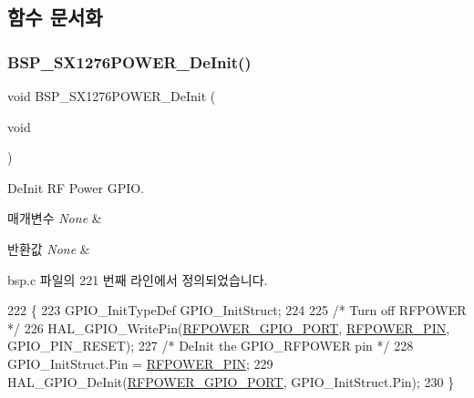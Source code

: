 \subsection{함수 문서화}
\mbox{\label{group___docking_station___r_f___power___functions_ga42c7cbbf0254f5f11135797d083bcb2c}} 
\subsubsection{\texorpdfstring{B\+S\+P\+\_\+\+S\+X1276\+P\+O\+W\+E\+R\+\_\+\+De\+Init()}{BSP\_SX1276POWER\_DeInit()}}
{\footnotesize\ttfamily void B\+S\+P\+\_\+\+S\+X1276\+P\+O\+W\+E\+R\+\_\+\+De\+Init (\begin{DoxyParamCaption}\item[{void}]{ }\end{DoxyParamCaption})}



De\+Init RF Power G\+P\+IO. 


\begin{DoxyParams}{매개변수}
{\em None} & \\
\hline
\end{DoxyParams}

\begin{DoxyRetVals}{반환값}
{\em None} & \\
\hline
\end{DoxyRetVals}


bsp.\+c 파일의 221 번째 라인에서 정의되었습니다.


\begin{DoxyCode}
222 \{
223   GPIO\_InitTypeDef  GPIO\_InitStruct;
224 
225   \textcolor{comment}{/* Turn off RFPOWER */}
226   HAL\_GPIO\_WritePin(\mbox{\hyperlink{_lory_s_d_k__hw__conf_8h_a8f8e11c368ec33b36ed1ba4d84bdc555}{RFPOWER\_GPIO\_PORT}}, \mbox{\hyperlink{_lory_s_d_k__hw__conf_8h_a15fab54516f17b1b5a79b1fbfc397d79}{RFPOWER\_PIN}}, GPIO\_PIN\_RESET);
227   \textcolor{comment}{/* DeInit the GPIO\_RFPOWER pin */}
228   GPIO\_InitStruct.Pin = \mbox{\hyperlink{_lory_s_d_k__hw__conf_8h_a15fab54516f17b1b5a79b1fbfc397d79}{RFPOWER\_PIN}};
229   HAL\_GPIO\_DeInit(\mbox{\hyperlink{_lory_s_d_k__hw__conf_8h_a8f8e11c368ec33b36ed1ba4d84bdc555}{RFPOWER\_GPIO\_PORT}}, GPIO\_InitStruct.Pin);
230 \}
\end{DoxyCode}
\mbox{\label{group___docking_station___r_f___power___functions_ga46ccfec03200a24f3737fc8015e2d5f7}} 
